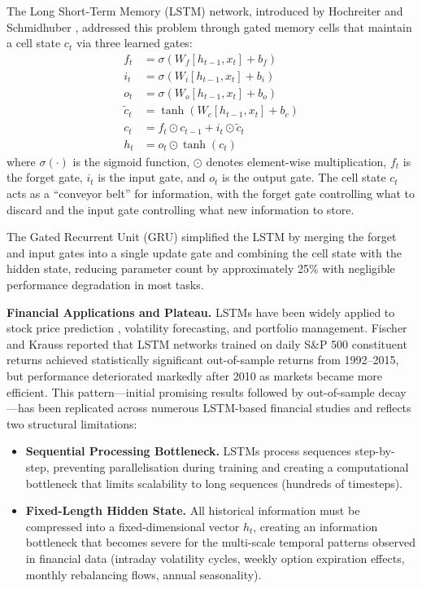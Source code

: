 \documentclass[conference]{IEEEtran}
\begin{document}
The Long Short-Term Memory (LSTM) network, introduced by Hochreiter and Schmidhuber \cite{hochreiter1997long}, addressed this problem through gated memory cells that maintain a cell state $c_t$ via three learned gates:
\begin{align}
f_t &= \sigma(W_f [h_{t-1}, x_t] + b_f) \label{eq:forget}\\
i_t &= \sigma(W_i [h_{t-1}, x_t] + b_i) \label{eq:input}\\
o_t &= \sigma(W_o [h_{t-1}, x_t] + b_o) \label{eq:output}\\
\tilde{c}_t &= \tanh(W_c [h_{t-1}, x_t] + b_c) \label{eq:candidate}\\
c_t &= f_t \odot c_{t-1} + i_t \odot \tilde{c}_t \label{eq:cell}\\
h_t &= o_t \odot \tanh(c_t) \label{eq:hidden}
\end{align}
where $\sigma(\cdot)$ is the sigmoid function, $\odot$ denotes element-wise multiplication, $f_t$ is the forget gate, $i_t$ is the input gate, and $o_t$ is the output gate. The cell state $c_t$ acts as a ``conveyor belt'' for information, with the forget gate controlling what to discard and the input gate controlling what new information to store.

The Gated Recurrent Unit (GRU) \cite{cho2014learning} simplified the LSTM by merging the forget and input gates into a single update gate and combining the cell state with the hidden state, reducing parameter count by approximately 25\% with negligible performance degradation in most tasks.

\textbf{Financial Applications and Plateau.} LSTMs have been widely applied to stock price prediction \cite{fischer2018deep}, volatility forecasting, and portfolio management. Fischer and Krauss \cite{fischer2018deep} reported that LSTM networks trained on daily S\&P 500 constituent returns achieved statistically significant out-of-sample returns from 1992--2015, but performance deteriorated markedly after 2010 as markets became more efficient. This pattern---initial promising results followed by out-of-sample decay---has been replicated across numerous LSTM-based financial studies and reflects two structural limitations:

\begin{itemize}[nosep]
    \item \textbf{Sequential Processing Bottleneck.} LSTMs process sequences step-by-step, preventing parallelisation during training and creating a computational bottleneck that limits scalability to long sequences (hundreds of timesteps).
    \item \textbf{Fixed-Length Hidden State.} All historical information must be compressed into a fixed-dimensional vector $h_t$, creating an information bottleneck that becomes severe for the multi-scale temporal patterns observed in financial data (intraday volatility cycles, weekly option expiration effects, monthly rebalancing flows, annual seasonality).
\end{itemize}
\end{document}
